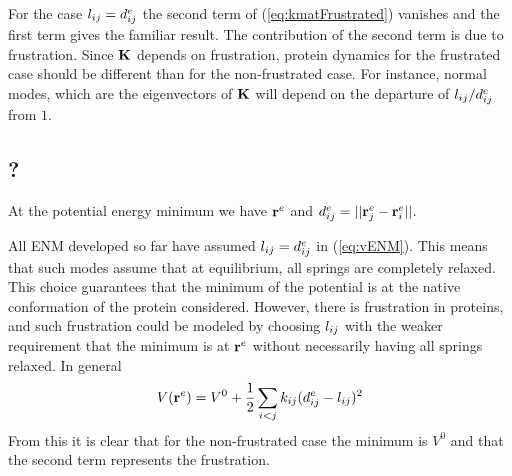 For the case $l_{ij} = d_{ij}^{e}$ the second term of (\ref{eq:kmatFrustrated}) vanishes and the first term gives the familiar result. The contribution of the second term is due to frustration. Since $\mathbf{K}$ depends on frustration, protein dynamics for the frustrated case should be different than for the non-frustrated case. For instance, normal modes, which are the eigenvectors of $\mathbf{K}$ will depend on the departure of $l_{ij}/d_{ij}^{e}$ from $1$. 



\subsection{?}

At the potential energy minimum we have $\mathbf{r}^{e}$ and $d_{ij}^{e} = ||\mathbf{r}_j^{e} - \mathbf{r}_i^{e}||$. 

All ENM developed so far have assumed $l_{ij} = d_{ij}^{e}$ in (\ref{eq:vENM}). This means that such modes assume that at equilibrium, all springs are completely relaxed. This choice guarantees that the minimum of the potential is at the native conformation of the protein considered. However, there is frustration in proteins, and such frustration could be modeled by choosing $l_{ij}$ with the weaker requirement that the minimum is at $\mathbf{r}^{e}$ without necessarily having all springs relaxed. In general 
\begin{equation} \label{eq:VminFrustrated}
V(\mathbf{r}^{e}) = V^0 + \frac{1}{2} \sum_{i<j} k_{ij} (d_{ij}^{e} - l_{ij})^2
\end{equation}
From this it is clear that for the non-frustrated case the minimum is $V^0$ and that the second term represents the frustration.